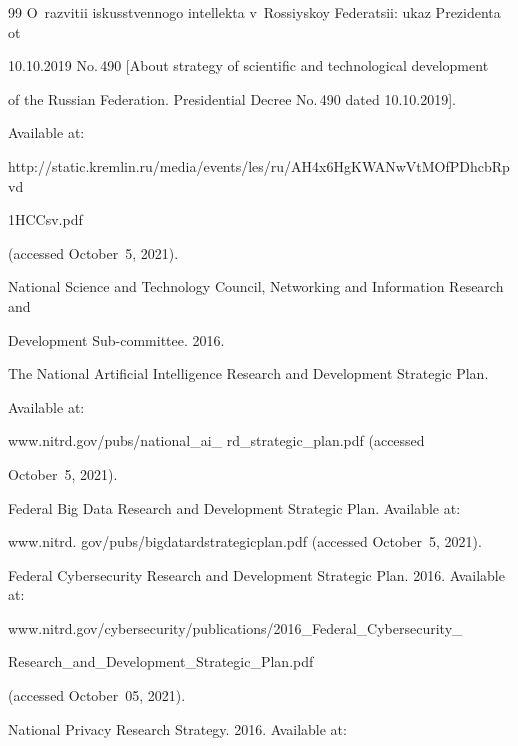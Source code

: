 {{\begin{thebibliography}{99}
O~razvitii iskusstvennogo intellekta v~Rossiyskoy Federatsii: ukaz Prezidenta ot


10.10.2019 No.\,490 [About strategy of scientific and technological development


of the Russian Federation. Presidential Decree No.\,490 dated 10.10.2019].


Available at:


     {\sf


http://static.kremlin.ru/media/events/les/ru/AH4x6HgKWANwVtMOfPDhcbRpvd


1HCCsv.pdf} (accessed October~5, 2021).




     National Science and Technology Council, Networking and Information Research and


Development Sub-committee. 2016.


The National Artificial Intelligence Research and Development Strategic Plan.


Available at:


     {\sf www.nitrd.gov/pubs/national\_ai\_ rd\_strategic\_plan.pdf} (accessed


October~5, 2021).







Federal Big Data Research and Development Strategic Plan. Available at:


     {\sf www.nitrd. gov/pubs/bigdatardstrategicplan.pdf} (accessed October~5, 2021).


     


     \pagebreak


     




Federal Cybersecurity Research and Development Strategic Plan. 2016. Available at:


{\sf www.nitrd.gov/cybersecurity/publications/2016\_Federal\_Cybersecurity\_\linebreak 


Research\_and\_Development\_Strategic\_Plan.pdf}


 (accessed October~05, 2021).




National Privacy Research Strategy. 2016. Available at:



\end{thebibliography}}}
